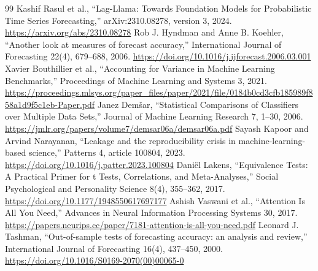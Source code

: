 \documentclass[journal,twoside,print]{ieeecolor}
\begin{document}
\begin{thebibliography}{99}
 Kashif Rasul et al., ``Lag-Llama: Towards Foundation Models for Probabilistic Time Series Forecasting,'' arXiv:2310.08278, version 3, 2024. \url{https://arxiv.org/abs/2310.08278}
 Rob J. Hyndman and Anne B. Koehler, ``Another look at measures of forecast accuracy,'' International Journal of Forecasting 22(4), 679--688, 2006. \url{https://doi.org/10.1016/j.ijforecast.2006.03.001}
 Xavier Bouthillier et al., ``Accounting for Variance in Machine Learning Benchmarks,'' Proceedings of Machine Learning and Systems 3, 2021. \url{https://proceedings.mlsys.org/paper_files/paper/2021/file/0184b0cd3cfb185989f858a1d9f5c1eb-Paper.pdf}
 Janez Demšar, ``Statistical Comparisons of Classifiers over Multiple Data Sets,'' Journal of Machine Learning Research 7, 1--30, 2006. \url{https://jmlr.org/papers/volume7/demsar06a/demsar06a.pdf}
 Sayash Kapoor and Arvind Narayanan, ``Leakage and the reproducibility crisis in machine-learning-based science,'' Patterns 4, article 100804, 2023. \url{https://doi.org/10.1016/j.patter.2023.100804}
 Daniël Lakens, ``Equivalence Tests: A Practical Primer for t Tests, Correlations, and Meta-Analyses,'' Social Psychological and Personality Science 8(4), 355--362, 2017. \url{https://doi.org/10.1177/1948550617697177}
 Ashish Vaswani et al., ``Attention Is All You Need,'' Advances in Neural Information Processing Systems 30, 2017. \url{https://papers.neurips.cc/paper/7181-attention-is-all-you-need.pdf}
 Leonard J. Tashman, ``Out-of-sample tests of forecasting accuracy: an analysis and review,'' International Journal of Forecasting 16(4), 437--450, 2000. \url{https://doi.org/10.1016/S0169-2070(00)00065-0}
\end{thebibliography}
\end{document}
